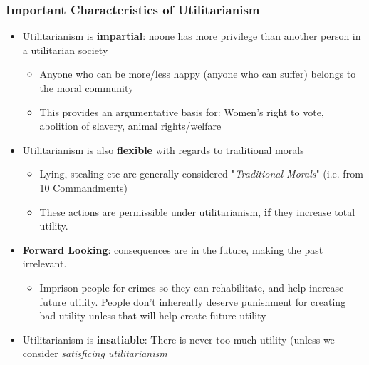 \documentclass{article}
\begin{document}
        \subsubsection{Important Characteristics of Utilitarianism}
        \begin{itemize}
            \item Utilitarianism is \textbf{impartial}: noone has more privilege than another person in a utilitarian society
            \begin{itemize}
                \item Anyone who can be more/less happy (anyone who can suffer) belongs to the moral community
                \item This provides an argumentative basis for: Women's right to vote, abolition of slavery, animal rights/welfare
            \end{itemize}{}
            \item Utilitarianism is also \textbf{flexible} with regards to traditional morals
            \begin{itemize}
                \item Lying, stealing etc are generally considered "\textit{Traditional Morals}" (i.e. from 10 Commandments)
                \item These actions are permissible under utilitarianism, \textbf{if} they increase total utility.
            \end{itemize}{}
            \item \textbf{Forward Looking}: consequences are in the future, making the past irrelevant.
            \begin{itemize}
                \item Imprison people for crimes so they can rehabilitate, and help increase future utility. People don't inherently deserve punishment for creating bad utility unless that will help create future utility
            \end{itemize}{}
            \item Utilitarianism is \textbf{insatiable}: There is never too much utility (unless we consider \textit{satisficing utilitarianism}
        \end{itemize}{}
        
\end{document}

